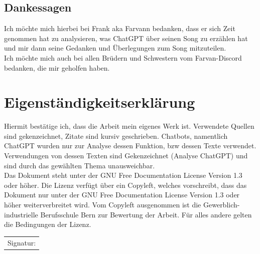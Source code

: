 \documentclass[twocolumn,10pt]{article}
\begin{document}
	\clearpage

	


	\onecolumn	\listoffigures{}
	\printbibliography[title=Quellenverzeichnis]
	\clearpage
	
	\subsection{Dankessagen}
	Ich möchte mich hierbei bei Frank aka Farvann bedanken, dass er sich Zeit genommen hat zu analysieren, was ChatGPT über seinen Song zu erzählen hat und mir dann seine Gedanken und Überlegungen zum Song  mitzuteilen.\\
	Ich möchte mich auch bei allen Brüdern und Schwestern vom Farvan-Discord bedanken, die mir geholfen haben.
	
	\clearpage	
	\onehalfspacing
	\section{Eigenständigkeitserklärung}
	Hiermit bestätige ich, dass die Arbeit mein eigenes Werk ist. Verwendete Quellen sind gekenzeichnet, Zitate sind kursiv geschrieben. Chatbots, namentlich ChatGPT\cite{ChatGPT} wurden nur zur Analyse dessen Funktion, bzw dessen Texte verwendet. Verwendungen von dessen Texten sind Gekenzeichnet (Analyse ChatGPT) und sind durch das gewählten Thema unausweichbar.\\
	Das Dokument steht unter der GNU Free Documentation License Version 1.3 oder höher. Die Lizenz verfügt über ein Copyleft, welches vorschreibt, dass das Dokument nur unter der GNU Free Documentation License Version 1.3 oder höher weiterverbreitet wird. Vom Copyleft ausgenommen ist die Gewerblich-industrielle Berufsschule Bern zur Bewertung der Arbeit. Für alles andere gelten die Bedingungen der Lizenz.
	\vspace{4cm}\\
	\makeatletter
	\begin{tabularx}{8cm}{X}
	\\\hline
	Signatur: \@author
	\end{tabularx}
	\makeatother

	
\end{document}
